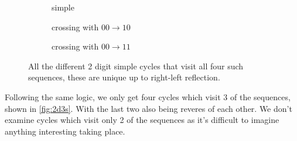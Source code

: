 \documentclass[11pt]{article}
\begin{document}
\begin{figure}[H]
    \centering
    \begin{subfigure}[t]{0.3\textwidth}
        \centering
        \caption{simple}\label{fig:2d4ss}
    \end{subfigure}
    \begin{subfigure}[t]{0.3\textwidth}
        \centering
        \caption{crossing with $00\rightarrow10$}\label{fig:2d4sc1}
    \end{subfigure}
    \begin{subfigure}[t]{0.3\textwidth}
        \centering
        \caption{crossing with $00\rightarrow11$}\label{fig:2d4sc2}
    \end{subfigure}
    \caption{
        All the different 2 digit simple cycles that visit all four such sequences, these are unique up to right-left reflection.
    }\label{fig:2d4s}
\end{figure}

Following the same logic, we only get four cycles which visit 3 of the sequences, shown in \cref{fig:2d3s}.
With the last two also being reveres of each other.
We don't examine cycles which visit only 2 of the sequences as it's difficult to imagine anything interesting taking place.
\end{document}
